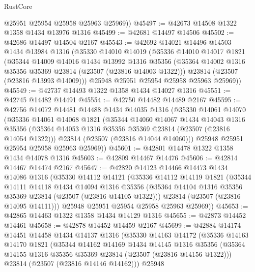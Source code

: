 \begin{lexlean}{RustCore}
\begin{coremodule}
        @25951
        @25954
        @25958
        @25963
        @25969))
@45497 := @42673 @14508 @1322 @1358 @1434 @13976 @1316
@45499 := @42681 @14497 @14506
@45502 := @42686 @14497 @14504 @2167
@45543 := @42692
    @14021
    @14496
    @14503
    @1434
    @13984
    @1316
    (@35330
      @14010
      @14019
      (@35336
        @14010
        @14017
        @1821
        (@35344
          @14009
          @14016
          @1434
          @13992
          @1316
          @35356
          (@35364 @14002 @1316 @35356 @35369 @23814 (@23507 (@23816 @14003 @1322)))
          @23814
          (@23507 (@23816 @13993 @14009)))
        @25948
        @25951
        @25954
        @25958
        @25963
        @25969))
@45549 := @42737 @14493 @1322 @1358 @1434 @14027 @1316
@45551 := @42745 @14482 @14491
@45554 := @42750 @14482 @14489 @2167
@45595 := @42756
    @14072
    @14481
    @14488
    @1434
    @14035
    @1316
    (@35330
      @14061
      @14070
      (@35336
        @14061
        @14068
        @1821
        (@35344
          @14060
          @14067
          @1434
          @14043
          @1316
          @35356
          (@35364 @14053 @1316 @35356 @35369 @23814 (@23507 (@23816 @14054 @1322)))
          @23814
          (@23507 (@23816 @14044 @14060)))
        @25948
        @25951
        @25954
        @25958
        @25963
        @25969))
@45601 := @42801 @14478 @1322 @1358 @1434 @14078 @1316
@45603 := @42809 @14467 @14476
@45606 := @42814 @14467 @14474 @2167
@45647 := @42820
    @14123
    @14466
    @14473
    @1434
    @14086
    @1316
    (@35330
      @14112
      @14121
      (@35336
        @14112
        @14119
        @1821
        (@35344
          @14111
          @14118
          @1434
          @14094
          @1316
          @35356
          (@35364 @14104 @1316 @35356 @35369 @23814 (@23507 (@23816 @14105 @1322)))
          @23814
          (@23507 (@23816 @14095 @14111)))
        @25948
        @25951
        @25954
        @25958
        @25963
        @25969))
@45653 := @42865 @14463 @1322 @1358 @1434 @14129 @1316
@45655 := @42873 @14452 @14461
@45658 := @42878 @14452 @14459 @2167
@45699 := @42884
    @14174
    @14451
    @14458
    @1434
    @14137
    @1316
    (@35330
      @14163
      @14172
      (@35336
        @14163
        @14170
        @1821
        (@35344
          @14162
          @14169
          @1434
          @14145
          @1316
          @35356
          (@35364 @14155 @1316 @35356 @35369 @23814 (@23507 (@23816 @14156 @1322)))
          @23814
          (@23507 (@23816 @14146 @14162)))
        @25948

\end{coremodule}
\end{lexlean}
